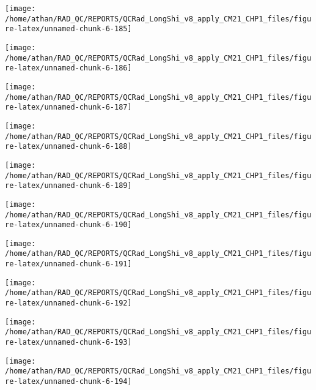 \documentclass[
  10pt,
  a4paper,oneside]{article}
\begin{document}
\begin{center}\texttt{[image: /home/athan/RAD\_QC/REPORTS/QCRad\_LongShi\_v8\_apply\_CM21\_CHP1\_files/figure-latex/unnamed-chunk-6-185]} \end{center}

\begin{center}\texttt{[image: /home/athan/RAD\_QC/REPORTS/QCRad\_LongShi\_v8\_apply\_CM21\_CHP1\_files/figure-latex/unnamed-chunk-6-186]} \end{center}

\begin{center}\texttt{[image: /home/athan/RAD\_QC/REPORTS/QCRad\_LongShi\_v8\_apply\_CM21\_CHP1\_files/figure-latex/unnamed-chunk-6-187]} \end{center}

\begin{center}\texttt{[image: /home/athan/RAD\_QC/REPORTS/QCRad\_LongShi\_v8\_apply\_CM21\_CHP1\_files/figure-latex/unnamed-chunk-6-188]} \end{center}

\begin{center}\texttt{[image: /home/athan/RAD\_QC/REPORTS/QCRad\_LongShi\_v8\_apply\_CM21\_CHP1\_files/figure-latex/unnamed-chunk-6-189]} \end{center}

\begin{center}\texttt{[image: /home/athan/RAD\_QC/REPORTS/QCRad\_LongShi\_v8\_apply\_CM21\_CHP1\_files/figure-latex/unnamed-chunk-6-190]} \end{center}

\begin{center}\texttt{[image: /home/athan/RAD\_QC/REPORTS/QCRad\_LongShi\_v8\_apply\_CM21\_CHP1\_files/figure-latex/unnamed-chunk-6-191]} \end{center}

\begin{center}\texttt{[image: /home/athan/RAD\_QC/REPORTS/QCRad\_LongShi\_v8\_apply\_CM21\_CHP1\_files/figure-latex/unnamed-chunk-6-192]} \end{center}

\begin{center}\texttt{[image: /home/athan/RAD\_QC/REPORTS/QCRad\_LongShi\_v8\_apply\_CM21\_CHP1\_files/figure-latex/unnamed-chunk-6-193]} \end{center}

\begin{center}\texttt{[image: /home/athan/RAD\_QC/REPORTS/QCRad\_LongShi\_v8\_apply\_CM21\_CHP1\_files/figure-latex/unnamed-chunk-6-194]} \end{center}
\end{document}
